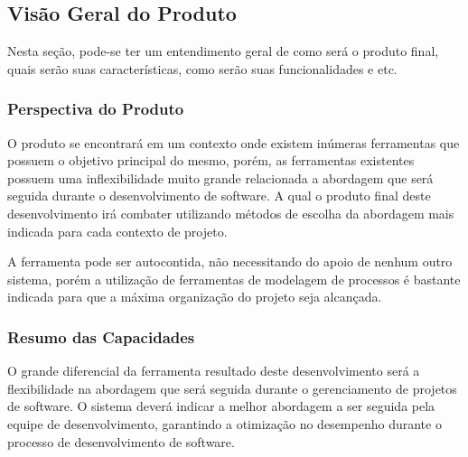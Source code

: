 

\subsection{Visão Geral do Produto}
	
	Nesta seção, pode-se ter um entendimento geral de como será o produto final, quais serão suas características, como serão suas funcionalidades e etc.

\subsubsection{Perspectiva do Produto}
	
	O produto se encontrará em um contexto onde existem inúmeras ferramentas que possuem o objetivo principal do mesmo, porém, as ferramentas existentes possuem uma inflexibilidade muito grande relacionada a abordagem que será seguida durante o desenvolvimento de software. A qual o produto final deste desenvolvimento irá combater utilizando métodos de escolha da abordagem mais indicada para cada contexto de projeto.

	A ferramenta pode ser autocontida, não necessitando do apoio de nenhum outro sistema, porém a utilização de ferramentas de modelagem de processos é bastante indicada para que a máxima organização do projeto seja alcançada.

\subsubsection{Resumo das Capacidades}
	
	O grande diferencial da ferramenta resultado deste desenvolvimento será a flexibilidade na abordagem que será seguida durante o gerenciamento de projetos de software. O sistema deverá indicar a melhor abordagem a ser seguida pela equipe de desenvolvimento, garantindo a otimização no desempenho durante o processo de desenvolvimento de software.

